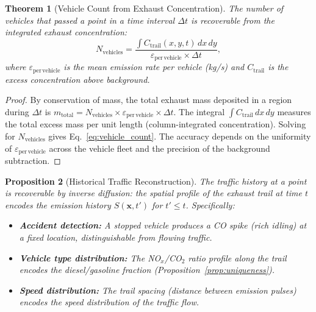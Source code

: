 \documentclass[11pt,twocolumn,a4paper]{article}
\theoremstyle{plain}
\newtheorem{theorem}{Theorem}[section]
\newtheorem{proposition}[theorem]{Proposition}
\theoremstyle{definition}
\theoremstyle{remark}
\newcommand{\Ctrail}{C_{\mathrm{trail}}}
\begin{document}
\begin{theorem}[Vehicle Count from Exhaust Concentration]
\label{thm:vehicle_count}
The number of vehicles that passed a point in a time interval $\Delta t$ is recoverable from the integrated exhaust concentration:
\begin{equation}
N_{\mathrm{vehicles}} = \frac{\int \Ctrail(x, y, t) \, dx \, dy}{\varepsilon_{\mathrm{per\,vehicle}} \times \Delta t},
\label{eq:vehicle_count}
\end{equation}
where $\varepsilon_{\mathrm{per\,vehicle}}$ is the mean emission rate per vehicle (kg/s) and $\Ctrail$ is the excess concentration above background.
\end{theorem}

\begin{proof}
By conservation of mass, the total exhaust mass deposited in a region during $\Delta t$ is $m_{\mathrm{total}} = N_{\mathrm{vehicles}} \times \varepsilon_{\mathrm{per\,vehicle}} \times \Delta t$. The integral $\int \Ctrail \, dx \, dy$ measures the total excess mass per unit length (column-integrated concentration). Solving for $N_{\mathrm{vehicles}}$ gives Eq.~\eqref{eq:vehicle_count}. The accuracy depends on the uniformity of $\varepsilon_{\mathrm{per\,vehicle}}$ across the vehicle fleet and the precision of the background subtraction.
\end{proof}

\begin{proposition}[Historical Traffic Reconstruction]
\label{prop:historical}
The traffic history at a point is recoverable by inverse diffusion: the spatial profile of the exhaust trail at time $t$ encodes the emission history $S(\mathbf{x}, t')$ for $t' \leq t$. Specifically:
\begin{itemize}[nosep]
    \item \textbf{Accident detection:} A stopped vehicle produces a CO spike (rich idling) at a fixed location, distinguishable from flowing traffic.
    \item \textbf{Vehicle type distribution:} The NO$_x$/CO$_2$ ratio profile along the trail encodes the diesel/gasoline fraction (Proposition~\ref{prop:uniqueness}).
    \item \textbf{Speed distribution:} The trail spacing (distance between emission pulses) encodes the speed distribution of the traffic flow.
\end{itemize}
\end{proposition}
\end{document}
